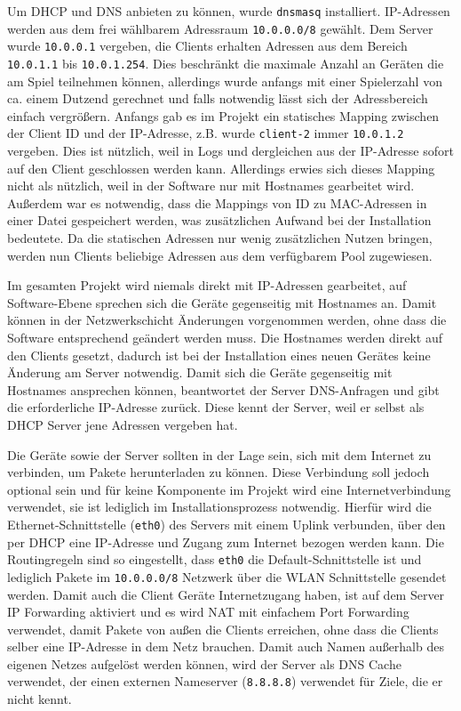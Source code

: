 Um DHCP und DNS anbieten zu können, wurde \texttt{dnsmasq} installiert. IP-Adressen
werden aus dem frei wählbarem Adressraum \texttt{10.0.0.0/8} gewählt. Dem Server wurde
\texttt{10.0.0.1} vergeben, die Clients erhalten Adressen aus dem Bereich \texttt{10.0.1.1} bis
\texttt{10.0.1.254}. Dies beschränkt die maximale Anzahl an Geräten die am Spiel
teilnehmen können, allerdings wurde anfangs mit einer Spielerzahl von ca.
einem Dutzend gerechnet und falls notwendig lässt sich der Adressbereich einfach
vergrößern. Anfangs gab es im Projekt ein statisches Mapping zwischen der
Client ID und der IP-Adresse, z.B. wurde \texttt{client-2} immer \texttt{10.0.1.2} vergeben.
Dies ist nützlich, weil in Logs und dergleichen aus der IP-Adresse sofort auf
den Client geschlossen werden kann. Allerdings erwies sich dieses Mapping nicht
als nützlich, weil in der Software nur mit Hostnames gearbeitet wird. Außerdem
war es notwendig, dass die Mappings von ID zu MAC-Adressen in einer Datei
gespeichert werden, was zusätzlichen Aufwand bei der Installation bedeutete.
Da die statischen Adressen nur wenig zusätzlichen Nutzen bringen, werden nun
Clients beliebige Adressen aus dem verfügbarem Pool zugewiesen.

Im gesamten Projekt wird niemals direkt mit IP-Adressen gearbeitet, auf
Software-Ebene sprechen sich die Geräte gegenseitig mit Hostnames an. Damit
können in der Netzwerkschicht Änderungen vorgenommen werden, ohne dass die
Software entsprechend geändert werden muss. Die Hostnames werden direkt auf
den Clients gesetzt, dadurch ist bei der Installation eines neuen Gerätes keine
Änderung am Server notwendig. Damit sich die Geräte gegenseitig mit Hostnames
ansprechen können, beantwortet der Server DNS-Anfragen und gibt die
erforderliche IP-Adresse zurück. Diese kennt der Server, weil er selbst als
DHCP Server jene Adressen vergeben hat.

Die Geräte sowie der Server sollten in der Lage sein, sich mit dem Internet
zu verbinden, um Pakete herunterladen zu können. Diese Verbindung soll jedoch
optional sein und für keine Komponente im Projekt wird eine Internetverbindung
verwendet, sie ist lediglich im Installationsprozess notwendig. Hierfür wird
die Ethernet-Schnittstelle (\texttt{eth0}) des Servers mit einem Uplink verbunden, über
den per DHCP eine IP-Adresse und Zugang zum Internet bezogen werden kann. Die
Routingregeln sind so eingestellt, dass \texttt{eth0} die Default-Schnittstelle ist und
lediglich Pakete im \texttt{10.0.0.0/8} Netzwerk über die WLAN Schnittstelle gesendet
werden. Damit auch die Client Geräte Internetzugang haben, ist auf dem Server
IP Forwarding aktiviert und es wird NAT mit einfachem Port Forwarding verwendet,
damit Pakete von außen die Clients erreichen, ohne dass die Clients selber eine
IP-Adresse in dem Netz brauchen. Damit auch Namen außerhalb des eigenen Netzes
aufgelöst werden können, wird der Server als DNS Cache verwendet, der einen externen
Nameserver (\texttt{8.8.8.8}) verwendet für Ziele, die er nicht kennt.
